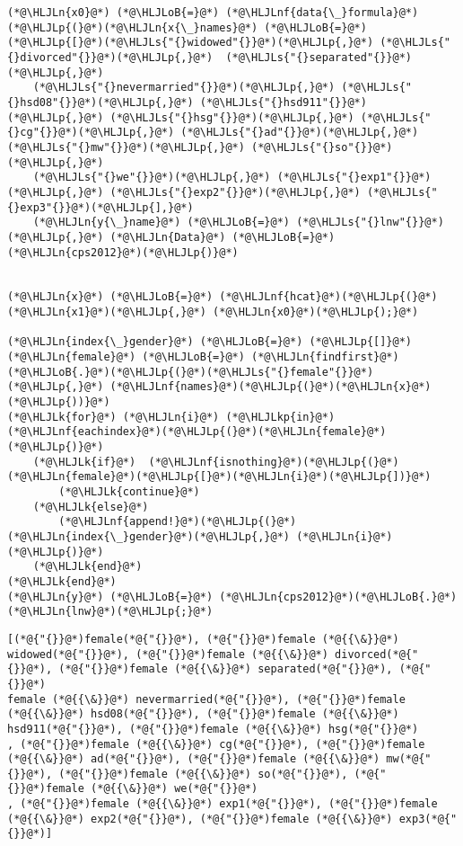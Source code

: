 \documentclass[12pt,a4paper]{article}
\newcommand{\HLJLk}[1]{\textcolor[RGB]{148,91,176}{\textbf{#1}}}
\newcommand{\HLJLkp}[1]{\textcolor[RGB]{148,91,176}{\textbf{#1}}}
\newcommand{\HLJLn}[1]{#1}
\newcommand{\HLJLnf}[1]{\textcolor[RGB]{66,102,213}{#1}}
\newcommand{\HLJLs}[1]{\textcolor[RGB]{201,61,57}{#1}}
\newcommand{\HLJLoB}[1]{\textcolor[RGB]{102,102,102}{\textbf{#1}}}
\newcommand{\HLJLp}[1]{#1}
\begin{document}
\begin{lstlisting}
(*@\HLJLn{x0}@*) (*@\HLJLoB{=}@*) (*@\HLJLnf{data{\_}formula}@*)(*@\HLJLp{(}@*)(*@\HLJLn{x{\_}names}@*) (*@\HLJLoB{=}@*) (*@\HLJLp{[}@*)(*@\HLJLs{"{}widowed"{}}@*)(*@\HLJLp{,}@*) (*@\HLJLs{"{}divorced"{}}@*)(*@\HLJLp{,}@*)  (*@\HLJLs{"{}separated"{}}@*)(*@\HLJLp{,}@*)
    (*@\HLJLs{"{}nevermarried"{}}@*)(*@\HLJLp{,}@*) (*@\HLJLs{"{}hsd08"{}}@*)(*@\HLJLp{,}@*) (*@\HLJLs{"{}hsd911"{}}@*)(*@\HLJLp{,}@*) (*@\HLJLs{"{}hsg"{}}@*)(*@\HLJLp{,}@*) (*@\HLJLs{"{}cg"{}}@*)(*@\HLJLp{,}@*) (*@\HLJLs{"{}ad"{}}@*)(*@\HLJLp{,}@*) (*@\HLJLs{"{}mw"{}}@*)(*@\HLJLp{,}@*) (*@\HLJLs{"{}so"{}}@*)(*@\HLJLp{,}@*)
    (*@\HLJLs{"{}we"{}}@*)(*@\HLJLp{,}@*) (*@\HLJLs{"{}exp1"{}}@*)(*@\HLJLp{,}@*) (*@\HLJLs{"{}exp2"{}}@*)(*@\HLJLp{,}@*) (*@\HLJLs{"{}exp3"{}}@*)(*@\HLJLp{],}@*) 
    (*@\HLJLn{y{\_}name}@*) (*@\HLJLoB{=}@*) (*@\HLJLs{"{}lnw"{}}@*)(*@\HLJLp{,}@*) (*@\HLJLn{Data}@*) (*@\HLJLoB{=}@*) (*@\HLJLn{cps2012}@*)(*@\HLJLp{)}@*)


(*@\HLJLn{x}@*) (*@\HLJLoB{=}@*) (*@\HLJLnf{hcat}@*)(*@\HLJLp{(}@*)(*@\HLJLn{x1}@*)(*@\HLJLp{,}@*) (*@\HLJLn{x0}@*)(*@\HLJLp{);}@*)

(*@\HLJLn{index{\_}gender}@*) (*@\HLJLoB{=}@*) (*@\HLJLp{[]}@*)
(*@\HLJLn{female}@*) (*@\HLJLoB{=}@*) (*@\HLJLn{findfirst}@*)(*@\HLJLoB{.}@*)(*@\HLJLp{(}@*)(*@\HLJLs{"{}female"{}}@*)(*@\HLJLp{,}@*) (*@\HLJLnf{names}@*)(*@\HLJLp{(}@*)(*@\HLJLn{x}@*)(*@\HLJLp{))}@*)
(*@\HLJLk{for}@*) (*@\HLJLn{i}@*) (*@\HLJLkp{in}@*) (*@\HLJLnf{eachindex}@*)(*@\HLJLp{(}@*)(*@\HLJLn{female}@*)(*@\HLJLp{)}@*)
    (*@\HLJLk{if}@*)  (*@\HLJLnf{isnothing}@*)(*@\HLJLp{(}@*)(*@\HLJLn{female}@*)(*@\HLJLp{[}@*)(*@\HLJLn{i}@*)(*@\HLJLp{])}@*)
        (*@\HLJLk{continue}@*)
    (*@\HLJLk{else}@*)
        (*@\HLJLnf{append!}@*)(*@\HLJLp{(}@*)(*@\HLJLn{index{\_}gender}@*)(*@\HLJLp{,}@*) (*@\HLJLn{i}@*)(*@\HLJLp{)}@*)
    (*@\HLJLk{end}@*)
(*@\HLJLk{end}@*)
(*@\HLJLn{y}@*) (*@\HLJLoB{=}@*) (*@\HLJLn{cps2012}@*)(*@\HLJLoB{.}@*)(*@\HLJLn{lnw}@*)(*@\HLJLp{;}@*)
\end{lstlisting}

\begin{lstlisting}
[(*@{"{}}@*)female(*@{"{}}@*), (*@{"{}}@*)female (*@{{\&}}@*) widowed(*@{"{}}@*), (*@{"{}}@*)female (*@{{\&}}@*) divorced(*@{"{}}@*), (*@{"{}}@*)female (*@{{\&}}@*) separated(*@{"{}}@*), (*@{"{}}@*)
female (*@{{\&}}@*) nevermarried(*@{"{}}@*), (*@{"{}}@*)female (*@{{\&}}@*) hsd08(*@{"{}}@*), (*@{"{}}@*)female (*@{{\&}}@*) hsd911(*@{"{}}@*), (*@{"{}}@*)female (*@{{\&}}@*) hsg(*@{"{}}@*)
, (*@{"{}}@*)female (*@{{\&}}@*) cg(*@{"{}}@*), (*@{"{}}@*)female (*@{{\&}}@*) ad(*@{"{}}@*), (*@{"{}}@*)female (*@{{\&}}@*) mw(*@{"{}}@*), (*@{"{}}@*)female (*@{{\&}}@*) so(*@{"{}}@*), (*@{"{}}@*)female (*@{{\&}}@*) we(*@{"{}}@*)
, (*@{"{}}@*)female (*@{{\&}}@*) exp1(*@{"{}}@*), (*@{"{}}@*)female (*@{{\&}}@*) exp2(*@{"{}}@*), (*@{"{}}@*)female (*@{{\&}}@*) exp3(*@{"{}}@*)]
\end{lstlisting}
\end{document}
